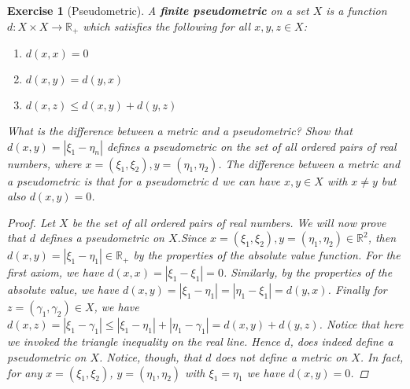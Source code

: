 \documentclass[11pt]{article}
\theoremstyle{mystyle}
\newtheorem{protoexer}{Exercise}[section]
\newenvironment{exer}
{\colorlet{shadecolor}{blue!15}\begin{shaded}\begin{protoexer}}
{\end{protoexer}\end{shaded}}
\newcommand{\0}{\mathbf{0}}
\begin{document}
\begin{exer}[Pseudometric]\label{pseudometric}
A \textbf{finite pseudometric} on a set $X$ is a function $d: X \times X \longrightarrow \mathbb{R}_+$ which satisfies the following for all $x, y, z \in X$:
\begin{enumerate}
    \item $d(x, x) = 0$
    \item $d(x, y) = d(y, x)$
    \item $d(x, z) \leq d(x, y) + d(y,z)$
\end{enumerate}
What is the difference between a metric and a pseudometric? Show that $d(x, y) = |\xi_1 - \eta_n|$ defines a pseudometric on the set of all ordered pairs of real numbers, where $x = (\xi_1, \xi_2), y = (\eta_1, \eta_2)$.\newline
The difference between a metric and a pseudometric is that for a pseudometric $d$ we can have $x, y \in X$ with $x \neq y$ but also $d(x, y) = 0$.
\begin{proof}
Let $X$ be the set of all ordered pairs of real numbers. We will now prove that $d$ defines a pseudometric on $X$.\newline Since $x = (\xi_1, \xi_2), y = (\eta_1, \eta_2) \in \mathbb{R}^2$, then $d(x, y) = |\xi_1 - \eta_1| \in \mathbb{R}_+$ by the properties of the absolute value function. For the first axiom, we have $d(x, x) = |\xi_1 - \xi_1| = 0$. Similarly, by the properties of the absolute value, we have $d(x, y) = |\xi_1 - \eta_1| = |\eta_1 - \xi_1| = d(y, x)$. Finally for $z = (\gamma_1, \gamma_2) \in X$, we have $d(x, z) = |\xi_1 - \gamma_1| \leq |\xi_1 - \eta_1| + |\eta_1 - \gamma_1| = d(x, y) + d(y, z)$. Notice that here we invoked the triangle inequality on the real line. Hence $d$, does indeed define a pseudometric on $X$.\newline
Notice, though, that $d$ does not define a metric on $X$. In fact, for any $x=(\xi_1, \xi_2)$, $y=(\eta_1, \eta_2)$ with $\xi_1 = \eta_1$ we have $d(x,y) = 0$.
\end{proof}
\end{exer}
\end{document}
